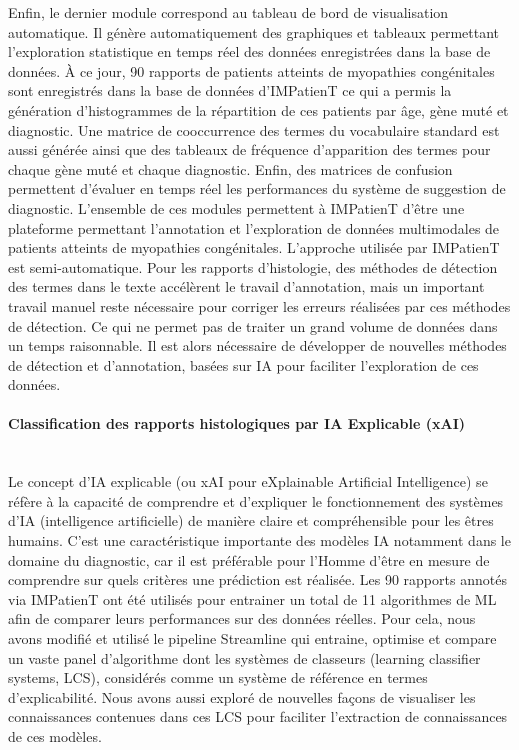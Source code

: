 Enfin, le dernier module correspond au tableau de bord de visualisation automatique. Il génère automatiquement des graphiques et tableaux permettant l’exploration statistique en temps réel des données enregistrées dans la base de données. À ce jour, 90 rapports de patients atteints de myopathies congénitales sont enregistrés dans la base de données d’IMPatienT ce qui a permis la génération d’histogrammes de la répartition de ces patients par âge, gène muté et diagnostic. Une matrice de cooccurrence des termes du vocabulaire standard est aussi générée ainsi que des tableaux de fréquence d’apparition des termes pour chaque gène muté et chaque diagnostic. Enfin, des matrices de confusion permettent d’évaluer en temps réel les performances du système de suggestion de diagnostic.
L’ensemble de ces modules permettent à IMPatienT d’être une plateforme permettant l’annotation et l’exploration de données multimodales de patients atteints de myopathies congénitales. L’approche utilisée par IMPatienT est semi-automatique. Pour les rapports d’histologie, des méthodes de détection des termes dans le texte accélèrent le travail d’annotation, mais un important travail manuel reste nécessaire pour corriger les erreurs réalisées par ces méthodes de détection. Ce qui ne permet pas de traiter un grand volume de données dans un temps raisonnable. Il est alors nécessaire de développer de nouvelles méthodes de détection et d’annotation, basées sur IA pour faciliter l’exploration de ces données.


\paragraph{\textbf{Classification des rapports histologiques par IA Explicable (xAI)}}\mbox{}\\

Le concept d’IA explicable (ou xAI pour eXplainable Artificial Intelligence) se réfère à la capacité de comprendre et d’expliquer le fonctionnement des systèmes d’IA (intelligence artificielle) de manière claire et compréhensible pour les êtres humains. C’est une caractéristique importante des modèles IA notamment dans le domaine du diagnostic, car il est préférable pour l’Homme d’être en mesure de comprendre sur quels critères une prédiction est réalisée. Les 90 rapports annotés via IMPatienT ont été utilisés pour entrainer un total de 11 algorithmes de ML afin de comparer leurs performances sur des données réelles. Pour cela, nous avons modifié et utilisé le pipeline Streamline qui entraine, optimise et compare un vaste panel d’algorithme dont les systèmes de classeurs (learning classifier systems, LCS), considérés comme un système de référence en termes d’explicabilité. Nous avons aussi exploré de nouvelles façons de visualiser les connaissances contenues dans ces LCS pour faciliter l’extraction de connaissances de ces modèles.

